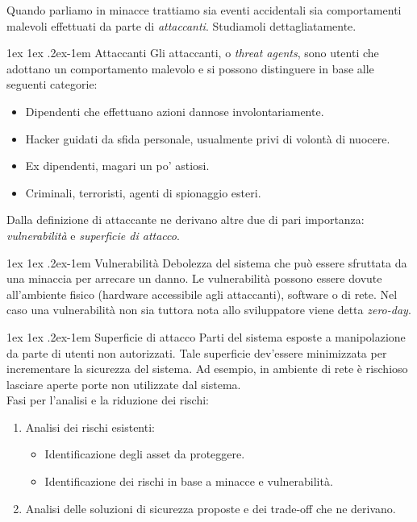 \documentclass[a4paper, 11pt, notitlepage, fleqn]{report}
\makeatletter
\renewcommand{\paragraph}{%
	\@startsection{paragraph}{4}%
	{\z@}{1ex \@plus 1ex \@minus .2ex}{-1em}%
	{\normalfont\normalsize\bfseries}%
}
\makeatother
\begin{document}
Quando parliamo in minacce trattiamo sia eventi accidentali sia comportamenti malevoli effettuati da parte di \emph{attaccanti}. Studiamoli dettagliatamente.

\paragraph{Attaccanti}
Gli attaccanti, o \emph{threat agents}, sono utenti che adottano un comportamento malevolo e si possono distinguere in base alle seguenti categorie:
\begin{itemize}
	\item Dipendenti che effettuano azioni dannose involontariamente.
	\item Hacker guidati da sfida personale, usualmente privi di volontà di nuocere.
	\item Ex dipendenti, magari un po' astiosi.
	\item Criminali, terroristi, agenti di spionaggio esteri.
\end{itemize}
Dalla definizione di attaccante ne derivano altre due di pari importanza: \emph{vulnerabilità} e \emph{superficie di attacco}.

\paragraph{Vulnerabilità}
Debolezza del sistema che può essere sfruttata da una minaccia per arrecare un danno.
Le vulnerabilità possono essere dovute all'ambiente fisico (hardware accessibile agli attaccanti), software o di rete. Nel caso una vulnerabilità non sia tuttora nota allo sviluppatore viene detta \emph{zero-day}.

\paragraph{Superficie di attacco}
Parti del sistema esposte a manipolazione da parte di utenti non autorizzati. Tale superficie dev'essere minimizzata per incrementare la sicurezza del sistema. Ad esempio, in ambiente di rete è rischioso lasciare aperte porte non utilizzate dal sistema.\\

\clearpage
\noindent Fasi per l'analisi e la riduzione dei rischi:
\begin{enumerate}
	\item Analisi dei rischi esistenti:
	\begin{itemize}
		\item Identificazione degli asset da proteggere.
		\item Identificazione dei rischi in base a minacce e vulnerabilità.
	\end{itemize}
	\item Analisi delle soluzioni di sicurezza proposte e dei trade-off che ne derivano.
\end{enumerate}
\end{document}
